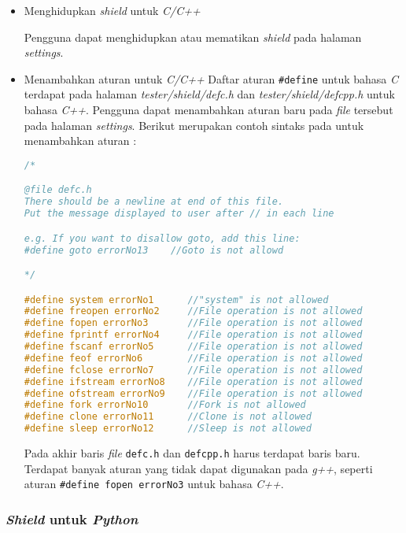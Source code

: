 \begin{itemize}
\item Menghidupkan \textit{shield} untuk \textit{C/C++}

Pengguna dapat menghidupkan atau mematikan \textit{shield} pada halaman \textit{settings}.

\item Menambahkan aturan untuk \textit{C/C++}
Daftar aturan \verb|#define| untuk bahasa \textit{C} terdapat pada halaman \textit{tester/shield/defc.h} dan \textit{tester/shield/defcpp.h} untuk bahasa \textit{C++}. Pengguna dapat menambahkan aturan baru pada \textit{file} tersebut pada halaman \textit{settings}. Berikut merupakan contoh sintaks pada untuk menambahkan aturan :

\begin{lstlisting}[language=C,caption=Sintaks aturan \textit{\#define}, label=kode:define]
/*

@file defc.h
There should be a newline at end of this file.
Put the message displayed to user after // in each line

e.g. If you want to disallow goto, add this line:
#define goto errorNo13    //Goto is not allowd

*/

#define system errorNo1      //"system" is not allowed
#define freopen errorNo2     //File operation is not allowed
#define fopen errorNo3       //File operation is not allowed
#define fprintf errorNo4     //File operation is not allowed
#define fscanf errorNo5      //File operation is not allowed
#define feof errorNo6        //File operation is not allowed
#define fclose errorNo7      //File operation is not allowed
#define ifstream errorNo8    //File operation is not allowed
#define ofstream errorNo9    //File operation is not allowed
#define fork errorNo10       //Fork is not allowed
#define clone errorNo11      //Clone is not allowed
#define sleep errorNo12      //Sleep is not allowed
\end{lstlisting}

Pada akhir baris \textit{file} \verb|defc.h| dan \verb|defcpp.h| harus terdapat baris baru. Terdapat banyak aturan yang tidak dapat digunakan pada \textit{g++}, seperti aturan \verb|#define fopen errorNo3| untuk bahasa \textit{C++}.

\end{itemize} 
\subsubsection{\textit{Shield} untuk \textit{Python}}

